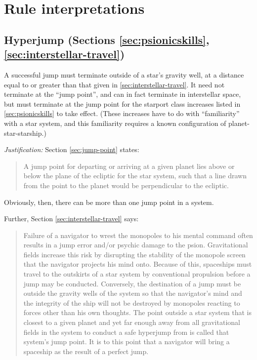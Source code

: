 \section{Rule interpretations}
\label{sec:rule-interpretations}


\subsection{Hyperjump (Sections \ref{sec:psionicskills},
  \ref{sec:interstellar-travel})}
\label{sec:hyperjump}

A successful jump must terminate outside of a star's gravity well, at
a distance equal to or greater than that given in
\ref{sec:interstellar-travel}.  It need not terminate at the ``jump
point'', and can in fact terminate in interstellar space, but must
terminate at the jump point for the starport class increases listed in
\ref{sec:psionicskills} to take effect.  (These increases have to do
with ``familiarity'' with a star system, and this familiarity requires
a known configuration of planet-star-starship.)

\emph{Justification:} Section \ref{sec:jump-point} states:

\begin{quote}
  A jump point for departing or arriving at a given planet lies above
  or below the plane of the ecliptic for the star system, such that a
  line drawn from the point to the planet would be perpendicular to
  the ecliptic.
\end{quote}

Obviously, then, there can be more than one jump point in a system.

Further, Section \ref{sec:interstellar-travel} says:

\begin{quote}
  Failure of a navigator to wrest the monopoles to his mental command
  often results in a jump error and/or psychic damage to the psion.
  Gravitational fields increase this risk by disrupting the stability
  of the monopole screen that the navigator projects his mind onto.
  Because of this, spaceships must travel to the outskirts of a star
  system by conventional propulsion before a jump may be conducted.
  Conversely, the destination of a jump must be outside the gravity
  wells of the system so that the navigator's mind and the integrity
  of the ship will not be destroyed by monopoles reacting to forces
  other than his own thoughts.  The point outside a star system that
  is closest to a given planet and yet far enough away from all
  gravitational fields in the system to conduct a safe hyperjump from
  is called that system's jump point.  It is to this point that a
  navigator will bring a spaceship as the result of a perfect jump.
\end{quote}

